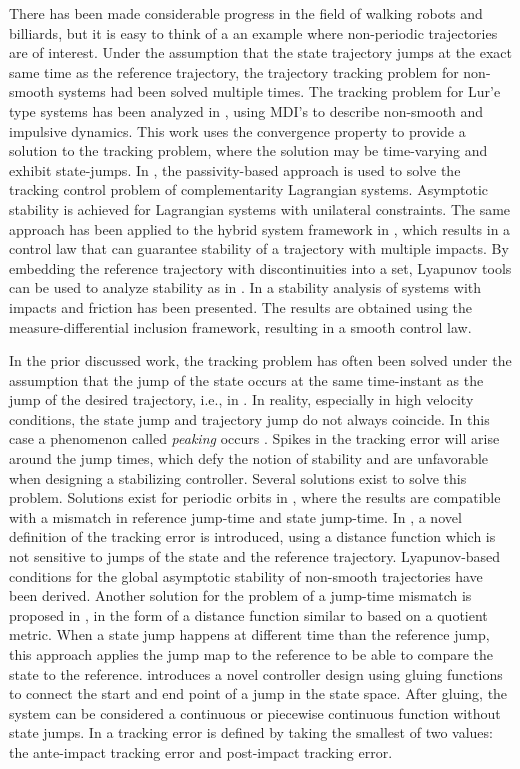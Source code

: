 \documentclass[../DC2017114Bouma.tex]{subfiles}
\begin{document}
There has been made considerable progress in the field of walking robots and billiards, but it is easy to think of a an example where non-periodic trajectories are of interest. Under the assumption that the state trajectory jumps at the exact same time as the reference trajectory, the trajectory tracking problem for non-smooth systems had been solved multiple times. The tracking problem for Lur'e type systems has been analyzed in \cite{VanDeWouw2008,Wouw2010}, using MDI's to describe non-smooth and impulsive dynamics. This work uses the convergence property to provide a solution to the tracking problem, where the solution may be time-varying and exhibit state-jumps. In \cite{Bourgeot2005}, the passivity-based approach is used to solve the tracking control problem of complementarity Lagrangian systems. Asymptotic stability is achieved for Lagrangian systems with unilateral constraints. The same approach has been applied to the hybrid system framework in \cite{Naldi2013}, which results in a control law that can guarantee stability of a trajectory with multiple impacts. By embedding the reference trajectory with discontinuities into a set, Lyapunov tools can be used to analyze stability as in \cite{Sanfelice2011,Sanfelice2014}. In \cite{Posa2016} a stability analysis of systems with impacts and friction has been presented. The results are obtained using the measure-differential inclusion framework, resulting in a smooth control law.

In the prior discussed work, the tracking problem has often been solved under the assumption that the jump of the state occurs at the same time-instant as the jump of the desired trajectory, i.e., in \cite{Naldi2013,Sanfelice2014,Posa2016}. In reality, especially in high velocity conditions, the state jump and trajectory jump do not always coincide. In this case a phenomenon called \textit{peaking} occurs \cite{Biemond2013}. Spikes in the tracking error will arise around the jump times, which defy the notion of stability and are unfavorable when designing a stabilizing controller. Several solutions exist to solve this problem. Solutions exist for periodic orbits in \cite{Menini2001,Galeani2008}, where the results are compatible with a mismatch in reference jump-time and state jump-time. In \cite{Biemond2013,Biemond2016}, a novel definition of the tracking error is introduced, using a distance function which is not sensitive to jumps of the state and the reference trajectory. Lyapunov-based conditions for the global asymptotic stability of non-smooth trajectories have been derived. Another solution for the problem of a jump-time mismatch is proposed in \cite{Baumann2018}, in the form of a distance function similar to \cite{Biemond2013,Biemond2016} based on a quotient metric. When a state jump happens at different time than the reference jump, this approach applies the jump map to the reference to be able to compare the state to the reference. \cite{Kim2016} introduces a novel controller design using gluing functions to connect the start and end point of a jump in the state space. After gluing, the system can be considered a continuous or piecewise continuous function without state jumps. In \cite{Yang2017} a tracking error is defined by taking the smallest of two values: the ante-impact tracking error and post-impact tracking error.
\end{document}
